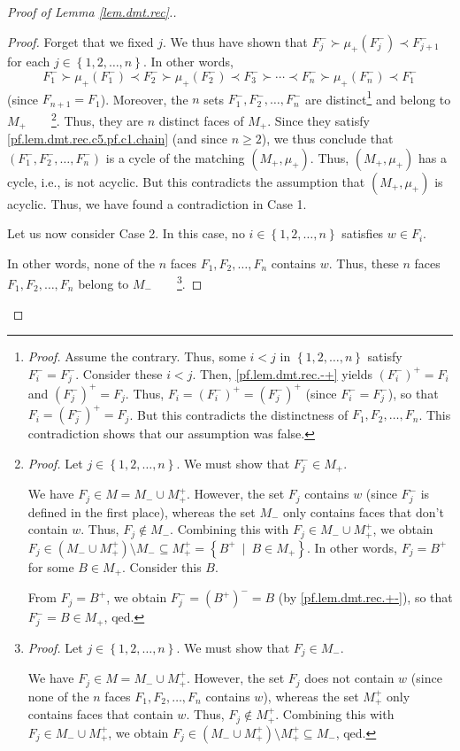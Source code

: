 \documentclass[12pt]{amsart}
\theoremstyle{definition}
\begin{document}
\begin{proof}[Proof of Lemma \ref{lem.dmt.rec}.]
\begin{proof}
Forget that we fixed $j$. We thus have shown that $F_{j}^-\succ\mu
_+\left(  F_{j}^-\right)  \prec F_{j+1}^-$ for each $j\in\left\{
1,2,\ldots,n\right\}  $. In other words,
\begin{equation}
      F_{1}^- \succ \mu_+\left(  F_{1}^-\right)
\prec F_{2}^- \succ \mu_+\left(  F_{2}^-\right)
\prec F_{3}^- \succ \cdots
\prec F_{n}^- \succ \mu_+\left(  F_{n}^-\right)
\prec F_{1}^-
\label{pf.lem.dmt.rec.c5.pf.c1.chain}
\end{equation}
(since $F_{n+1}=F_{1}$). Moreover, the $n$ sets $F_{1}^-,F_{2}^-,
\ldots,F_{n}^-$ are distinct\footnote{\textit{Proof.} Assume the contrary.
Thus, some $i<j$ in $\left\{  1,2,\ldots,n\right\}  $ satisfy $F_{i}^-
=F_{j}^-$. Consider these $i<j$. Then, \eqref{pf.lem.dmt.rec.-+} yields
$\left(  F_{i}^-\right)  ^+=F_{i}$ and $\left(  F_{j}^-\right)
^+=F_{j}$. Thus, $F_{i}=\left(  F_{i}^-\right)  ^+=\left(  F_{j}%
^-\right)  ^+$ (since $F_{i}^-=F_{j}^-$), so that $F_{i}=\left(  F_{j}%
^-\right)  ^+=F_{j}$. But this contradicts the distinctness of
$F_{1},F_{2},\ldots,F_{n}$. This contradiction shows that our assumption was
false.} and belong to $M_+$\ \ \ \ \footnote{\textit{Proof.} Let
$j\in\left\{  1,2,\ldots,n\right\}  $. We must show that $F_{j}^-\in M_+$.
\par
We have $F_{j}\in M=M_-\cup M_+^+$. However, the set $F_{j}$ contains
$w$ (since $F_{j}^-$ is defined in the first place), whereas the set $M_-$
only contains faces that don't contain $w$. Thus, $F_{j}\notin M_-$.
Combining this with $F_{j}\in M_-\cup M_+^+$, we obtain $F_{j}\in\left(
M_-\cup M_+^+\right)  \setminus M_-\subseteq M_+^+=\left\{
B^+\ \mid\ B\in M_+\right\}  $. In other words, $F_{j}=B^+$ for some
$B\in M_+$. Consider this $B$.
\par
From $F_{j}=B^+$, we obtain $F_{j}^-=\left(  B^+\right)  ^-=B$ (by
\eqref{pf.lem.dmt.rec.+-}), so that $F_{j}^-=B\in M_+$, qed.}. Thus, they
are $n$ distinct faces of $M_+$. Since they satisfy
\eqref{pf.lem.dmt.rec.c5.pf.c1.chain} (and since $n\geq2$), we thus conclude
that $\left(  F_{1}^-,F_{2}^-,\ldots,F_{n}^-\right)  $ is a cycle of the
matching $\left(  M_+,\mu_+\right)  $. Thus, $\left(  M_+,\mu
_+\right)  $ has a cycle, i.e., is not acyclic. But this contradicts the
assumption that $\left(  M_+,\mu_+\right)  $ is acyclic. Thus, we have
found a contradiction in Case 1.

Let us now consider Case 2. In this case, no $i\in\left\{  1,2,\ldots
,n\right\}  $ satisfies $w\in F_{i}$.

In other words, none of the $n$ faces $F_{1},F_{2},\ldots,F_{n}$ contains $w$.
Thus, these $n$ faces $F_{1},F_{2},\ldots,F_{n}$ belong to $M_-%
$\ \ \ \ \footnote{\textit{Proof.} Let $j\in\left\{  1,2,\ldots,n\right\}  $.
We must show that $F_{j}\in M_-$.
\par
We have $F_{j}\in M=M_-\cup M_+^+$. However, the set $F_{j}$ does not
contain $w$ (since none of the $n$ faces $F_{1},F_{2},\ldots,F_{n}$ contains
$w$), whereas the set $M_+^+$ only contains faces that contain $w$. Thus,
$F_{j}\notin M_+^+$. Combining this with $F_{j}\in M_-\cup M_+^+$,
we obtain $F_{j}\in\left(  M_-\cup M_+^+\right)  \setminus M_+%
^+\subseteq M_-$, qed.}.


\end{proof}
\end{proof}
\end{document}
